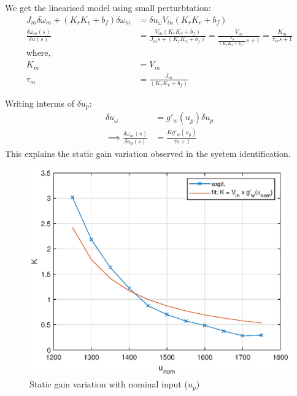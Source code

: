 We get the linearised model using small perturbtation:
\begin{align*}
    J_m \delta \dot \omega_m + (K_rK_v + b_f) \delta  \omega_m  &= \delta u_{\omega}V_{in}(K_r K_v  + b_f) \\
    \frac{\delta \omega_m (s)}{\delta u (s)} &= \frac{V_{in}(K_r K_v  + b_f)}{J_m s + (K_r K_v + b_f)} = \frac{V_{in}}{\frac{J_m}{(K_r K_v + b_f)} s + 1} = \frac{K_m}{\tau_m s + 1}\\
    \text{where, }\qquad &\\
    K_m &= V_{in}\\
    \tau_m &= \frac{J_m}{(K_rK_v + b_f)}
\end{align*}

\begin{minipage}{0.49\textwidth}
Writing interms of $\delta u_p$:
\begin{align*}
   \delta u_\omega &= g'_w(u_p) \delta u_p\\
   \implies \frac{\delta \omega_m (s)}{\delta u_{p} (s)} &= \frac{K g'_w(u_p)}{\tau s + 1}
\end{align*}
This explains the static gain variation observed in the system identification.
\end{minipage}
\begin{minipage}{0.49\textwidth}
 \begin{figure}[H]
    \centering
    \includegraphics[width = \textwidth]{./figs/norm_omega/K_fit.eps}
    \caption{Static gain variation with nominal input ($u_p$)}
\end{figure}
\end{minipage}
